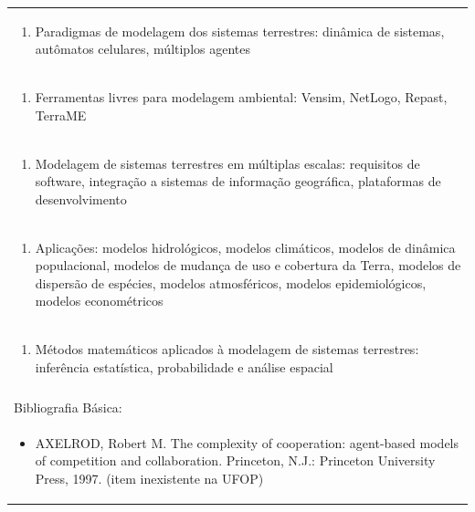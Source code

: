 \documentclass[11pt]{article}
\begin{document}
\begin{center}
\begin{longtable}{|p{4cm}|p{4cm}|p{4cm}|p{4cm}|}
\multicolumn{4}{|p{\dimexpr 16cm + 6\tabcolsep\relax}|}{\begin{enumerate}[start=6]\item Paradigmas de modelagem dos sistemas terrestres: dinâmica de sistemas, autômatos celulares, múltiplos agentes\end{enumerate}}\\
\multicolumn{4}{|p{\dimexpr 16cm + 6\tabcolsep\relax}|}{\begin{enumerate}[start=7]\item Ferramentas livres para modelagem ambiental: Vensim, NetLogo, Repast, TerraME\end{enumerate}}\\
\multicolumn{4}{|p{\dimexpr 16cm + 6\tabcolsep\relax}|}{\begin{enumerate}[start=8]\item Modelagem de sistemas terrestres em múltiplas escalas: requisitos de software, integração a sistemas de informação geográfica, plataformas de desenvolvimento\end{enumerate}}\\
\multicolumn{4}{|p{\dimexpr 16cm + 6\tabcolsep\relax}|}{\begin{enumerate}[start=9]\item Aplicações: modelos hidrológicos, modelos climáticos, modelos de dinâmica populacional, modelos de mudança de uso e cobertura da Terra, modelos de dispersão de espécies, modelos atmosféricos, modelos epidemiológicos, modelos econométricos\end{enumerate}}\\
\multicolumn{4}{|p{\dimexpr 16cm + 6\tabcolsep\relax}|}{\begin{enumerate}[start=10]\item Métodos matemáticos aplicados à modelagem de sistemas terrestres: inferência estatística, probabilidade e análise espacial\end{enumerate}}\\
\multicolumn{4}{|p{\dimexpr 16cm + 6\tabcolsep\relax}|}{}\\
\hline
\multicolumn{4}{|p{16cm}|}{Bibliografia Básica:}\\*
\multicolumn{4}{|p{\dimexpr 16cm + 6\tabcolsep\relax}|}{\begin{itemize}\item AXELROD, Robert M. The complexity of cooperation: agent-based models of competition and collaboration. Princeton, N.J.: Princeton University Press, 1997. (item inexistente na UFOP)\end{itemize}}\\

\end{longtable}
\end{center}
\end{document}
